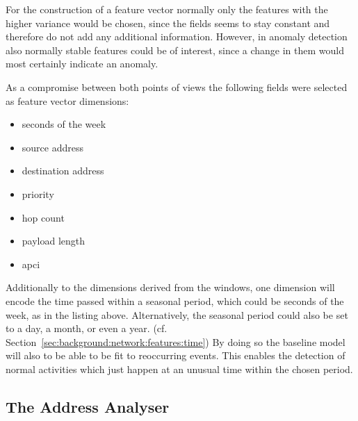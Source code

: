 For the construction of a feature vector normally only the features with the higher variance would be chosen, since the fields seems to stay constant and therefore do not add any additional information.
However, in anomaly detection also normally stable features could be of interest, since a change in them would most certainly indicate an anomaly.

As a compromise between both points of views the following fields were selected as feature vector dimensions:

\begin{itemize}
	\item seconds of the week
	\item source address
	\item destination address
	\item priority
	\item hop count
	\item payload length
	\item \gls{apci}
\end{itemize}

Additionally to the dimensions derived from the windows, one dimension will encode the time passed within a seasonal period, which could be seconds of the week, as in the listing above. Alternatively, the seasonal period could also be set to a day, a month, or even a year. (cf. Section~\ref{sec:background:network:features:time})
By doing so the baseline model will also to be able to be fit to reoccurring events. This enables the detection of normal activities which just happen at an unusual time within the chosen period.

\subsection{The Address Analyser}
\label{sec:concept:anal:addr}

